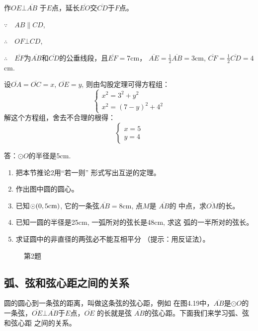 \begin{solution}
    作$OE\bot \overline{AB}$
于$E$点，延长$\overline{EO}$交$\overline{CD}$于$F$点。

$\because\quad AB\parallel CD$,

$\therefore\quad OF\bot CD$,

$\therefore\quad \overline{EF}$为$\overline{AB}$和$\overline{CD}$的公垂线段，且$\overline{EF}=7$cm，
$\overline{AE}=\frac{1}{2}\overline{AB}=3$cm, $\overline{CF}=
\frac{1}{2}\overline{CD}=4$cm.

设$\overline{OA}=\overline{OC}=x$, $\overline{OE}=y$, 则由勾股定理可得方程组：
\[\begin{cases}
    x^2=3^2+y^2\\
    x^2=(7-y)^2+4^2
\end{cases}\]
解这个方程组，舍去不合理的根得：
\[\begin{cases}
    x=5\\y=4
\end{cases}\]

答：$\odot O$的半径是5cm.
\end{solution}

\begin{ex}
\begin{enumerate}
    \item 把本节推论2用“若一则”
    形式写出互逆的定理。
    \item 作出图中圆的圆心。
    \item 已知$\odot(0,5{\rm cm})$, 它的一条弦$\overline{AB}=8$cm, 点$M$是
    $\overline{AB}$的
    中点，求$\overline{OM}$的长。
    \item 已知一圆的半径是25cm, 一弧所对的弦长是48cm, 求这
    弧的一半所对的弦长。
    \item 求证圆中的非直径的两弦必不能互相平分
    （提示：用反证法）。
\end{enumerate}
\end{ex}

\begin{figure}[htp]
    \centering
{}
    \caption*{第2题}
\end{figure}

\subsection{弧、弦和弦心距之间的关系}
圆的圆心到一条弦的距离，叫做这条弦的弦心距，例如
在图4.19中，$\overline{AB}$是$\odot O$的一条弦，$\overline{OE}\bot \overline{AB}$于$E$点，$\overline{OE}$
的长就是弦
$\overline{AB}$的弦心距。下面我们来学习弧、弦和弦心距
之间的关系。

